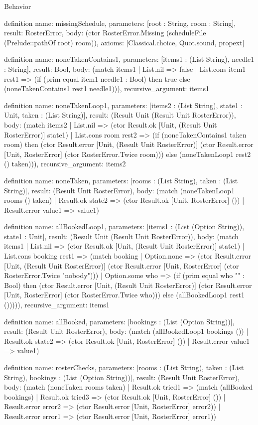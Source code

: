 \begin{lexlean}{Behavior}
\begin{semanticmodule}
definition{
  name: missingSchedule,
  parameters: [root : String, room : String],
  result: RosterError,
  body: (ctor RosterError.Missing (scheduleFile (Prelude::pathOf root) room)),
  axioms: [Classical.choice, Quot.sound, propext]
}

definition{
  name: noneTakenContains1,
  parameters: [items1 : (List String), needle1 : String],
  result: Bool,
  body: (match items1
    | List.nil => false
    | List.cons item1 rest1 => (if (prim equal item1 needle1 : Bool) then true else (noneTakenContains1 rest1 needle1))),
  recursive_argument: items1
}

definition{
  name: noneTakenLoop1,
  parameters: [items2 : (List String), state1 : Unit, taken : (List String)],
  result: (Result Unit (Result Unit RosterError)),
  body: (match items2
    | List.nil => (ctor Result.ok [Unit, (Result Unit RosterError)] state1)
    | List.cons room rest2 => (if (noneTakenContains1 taken room) then (ctor Result.error [Unit, (Result Unit RosterError)] (ctor Result.error [Unit, RosterError] (ctor RosterError.Twice room))) else (noneTakenLoop1 rest2 () taken))),
  recursive_argument: items2
}

definition{
  name: noneTaken,
  parameters: [rooms : (List String), taken : (List String)],
  result: (Result Unit RosterError),
  body: (match (noneTakenLoop1 rooms () taken)
    | Result.ok state2 => (ctor Result.ok [Unit, RosterError] ())
    | Result.error value1 => value1)
}

definition{
  name: allBookedLoop1,
  parameters: [items1 : (List (Option String)), state1 : Unit],
  result: (Result Unit (Result Unit RosterError)),
  body: (match items1
    | List.nil => (ctor Result.ok [Unit, (Result Unit RosterError)] state1)
    | List.cons booking rest1 => (match booking
      | Option.none => (ctor Result.error [Unit, (Result Unit RosterError)] (ctor Result.error [Unit, RosterError] (ctor RosterError.Twice "nobody")))
      | Option.some who => (if (prim equal who "" : Bool) then (ctor Result.error [Unit, (Result Unit RosterError)] (ctor Result.error [Unit, RosterError] (ctor RosterError.Twice who))) else (allBookedLoop1 rest1 ())))),
  recursive_argument: items1
}

definition{
  name: allBooked,
  parameters: [bookings : (List (Option String))],
  result: (Result Unit RosterError),
  body: (match (allBookedLoop1 bookings ())
    | Result.ok state2 => (ctor Result.ok [Unit, RosterError] ())
    | Result.error value1 => value1)
}

definition{
  name: rosterChecks,
  parameters: [rooms : (List String), taken : (List String), bookings : (List (Option String))],
  result: (Result Unit RosterError),
  body: (match (noneTaken rooms taken)
    | Result.ok tried1 => (match (allBooked bookings)
      | Result.ok tried3 => (ctor Result.ok [Unit, RosterError] ())
      | Result.error error2 => (ctor Result.error [Unit, RosterError] error2))
    | Result.error error1 => (ctor Result.error [Unit, RosterError] error1))
}


\end{semanticmodule}
\end{lexlean}
